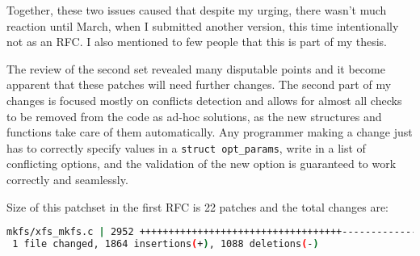 Together, these two issues caused that despite my urging, there wasn't much
reaction until March, when I submitted another version, this time
intentionally not as an RFC. I also mentioned to few people that this is
part of my thesis.

The review of the second set revealed many disputable points and it become
apparent that these patches will need further changes.
The second part of my changes is focused mostly on conflicts detection and allows for almost all checks to be removed from the code as ad-hoc solutions, as the new structures and functions take care of them automatically. Any programmer making a change just has to correctly specify values in a {\tt struct opt\_params}, write in a list of conflicting options, and the validation of the new option is guaranteed to work correctly and seamlessly.

Size of this patchset in the first RFC is 22 patches and the total changes are:
\begin{lstlisting}[frame=none, basicstyle=\footnotesize\ttfamily, language=Bash, numbers=none, numberstyle=\tiny\color{black},caption= {Git statistics for the second patchset~\cite{secondSetRFC}.}]
 mkfs/xfs_mkfs.c | 2952 +++++++++++++++++++++++++++++++++++--------------------
 1 file changed, 1864 insertions(+), 1088 deletions(-)
\end{lstlisting}


